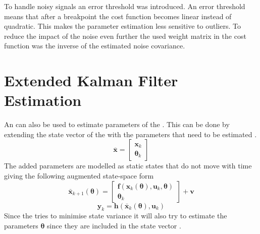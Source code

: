 To handle noisy signals an error threshold was introduced. An error threshold means that after a breakpoint the cost function becomes linear instead of quadratic. This makes the parameter estimation less sensitive to outliers. To reduce the impact of the noise even further the used weight matrix in the cost function was the inverse of the estimated noise covariance. 

\section{Extended Kalman Filter Estimation}
An \abbrEKF can also be used to estimate parameters of the \abbrROV. This can be done by extending the state vector of the \abbrEKF with the parameters that need to be estimated \citep{Roger}.
\begin{equation}
\bar{\boldsymbol{x}} = \begin{bmatrix}
\boldsymbol{x}_k\\
\boldsymbol{\theta}_k
\end{bmatrix}
\end{equation}
The added parameters are modelled as static states that do not move with time giving the following augmented state-space form 
\begin{equation}
\bar{\boldsymbol{x}}_{k+1}(\boldsymbol{\theta}) =\begin{bmatrix}
\boldsymbol{f}(\boldsymbol{x}_k(\boldsymbol{\theta}),\boldsymbol{u}_k,\boldsymbol{\theta})\\
\boldsymbol{\theta}_k
\end{bmatrix} 
+\boldsymbol{v}
\end{equation}
\begin{equation}
\boldsymbol{y}_k=\boldsymbol{h}(\bar{\boldsymbol{x}}_k(\boldsymbol{\theta}),\boldsymbol{u}_k)
\end{equation}
Since the \abbrEKF tries to minimise state variance it will also try to estimate the parameters $\boldsymbol{\theta}$ since they are included in the state vector \citep{Roger}.

